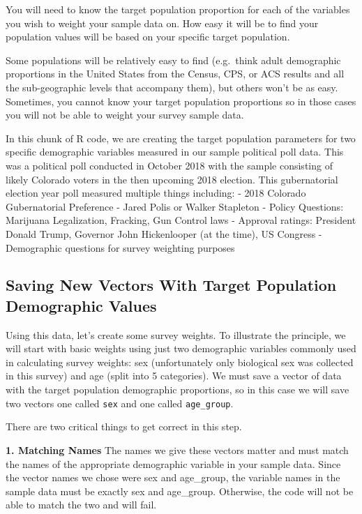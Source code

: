 \documentclass[
  letterpaper,
  DIV=11,
  numbers=noendperiod]{scrreprt}
\begin{document}
You will need to know the target population proportion for each of the
variables you wish to weight your sample data on. How easy it will be to
find your population values will be based on your specific target
population.

Some populations will be relatively easy to find (e.g.~think adult
demographic proportions in the United States from the Census, CPS, or
ACS results and all the sub-geographic levels that accompany them), but
others won't be as easy. Sometimes, you cannot know your target
population proportions so in those cases you will not be able to weight
your survey sample data.

In this chunk of R code, we are creating the target population
parameters for two specific demographic variables measured in our sample
political poll data. This was a political poll conducted in October 2018
with the sample consisting of likely Colorado voters in the then
upcoming 2018 election. This gubernatorial election year poll measured
multiple things including: - 2018 Colorado Gubernatorial Preference -
Jared Polis or Walker Stapleton - Policy Questions: Marijuana
Legalization, Fracking, Gun Control laws - Approval ratings: President
Donald Trump, Governor John Hickenlooper (at the time), US Congress -
Demographic questions for survey weighting purposes

\hypertarget{saving-new-vectors-with-target-population-demographic-values}{%
\subsection{Saving New Vectors With Target Population Demographic
Values}\label{saving-new-vectors-with-target-population-demographic-values}}

Using this data, let's create some survey weights. To illustrate the
principle, we will start with basic weights using just two demographic
variables commonly used in calculating survey weights: sex
(unfortunately only biological sex was collected in this survey) and age
(split into 5 categories). We must save a vector of data with the target
population demographic proportions, so in this case we will save two
vectors one called \texttt{sex} and one called \texttt{age\_group}.

There are two critical things to get correct in this step.

\textbf{1. Matching Names} The names we give these vectors matter and
must match the names of the appropriate demographic variable in your
sample data. Since the vector names we chose were sex and age\_group,
the variable names in the sample data must be exactly sex and
age\_group. Otherwise, the code will not be able to match the two and
will fail.
\end{document}
